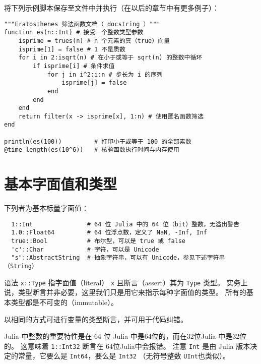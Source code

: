 \documentclass[10pt,a4paper]{article}
\begin{document}
将下列示例脚本保存至文件中并执行（在以后的章节中有更多例子）：
\begin{lstlisting}
"""Eratosthenes 筛法函数文档（ docstring ）"""
function es(n::Int) # 接受一个整数类型参数
    isprime = trues(n) # n 个元素的真（true）向量
    isprime[1] = false # 1 不是质数
    for i in 2:isqrt(n) # 在小于或等于 sqrt(n) 的整数中循环
        if isprime[i] # 条件求值
            for j in i^2:i:n # 步长为 i 的序列
                isprime[j] = false
            end
        end
    end
    return filter(x -> isprime[x], 1:n) # 使用匿名函数筛选
end

println(es(100))         # 打印小于或等于 100 的全部素数
@time length(es(10^6))   # 核验函数执行时间与内存使用
\end{lstlisting}

\section{基本字面值和类型}
下列者为基本标量字面值：
\begin{lstlisting}
  1::Int               # 64 位 Julia 中的 64 位（bit）整数，无溢出警告
  1.0::Float64         # 64 位浮点数，定义了 NaN, -Inf, Inf
  true::Bool           # 布尔型，可以是 true 或 false
  'c'::Char            # 字符，可以是 Unicode
  "s"::AbstractString  # 抽象字符串，可以有 Unicode，参见下述字符串（String） 
\end{lstlisting}
语法 \lstinline|x::Type| 指字面值（literal） \lstinline|x| 且断言（assert）其为 \lstinline|Type| 类型。
实务上说，类型断言并非必要，这里我们只是用它来指示每种字面值的类型。
所有的基本类型都是不可变的（immutable）。

以相同的方式可进行变量的类型断言，并可用于代码纠错。

Julia 中整数的重要特性是在 64 位 Julia 中是64位的，而在32位Julia 中是32位的。
这意味着 \lstinline|1::Int32| 断言在 64位Julia中会报错。
注意 \lstinline|Int| 是由 Julia 版本决定的常量，它要么是 \lstinline|Int64|，要么是 \lstinline|Int32|
（无符号整数 \lstinline|UInt|也类似）。
\end{document}
